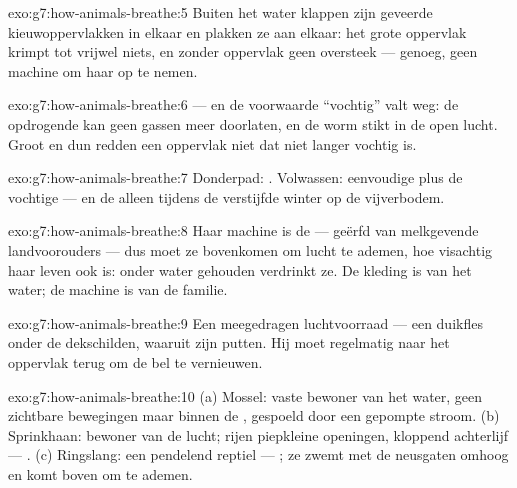 \begin{solution}{exo:g7:how-animals-breathe:5}
Buiten het water klappen zijn geveerde kieuwoppervlakken in elkaar en
plakken ze aan elkaar: het grote oppervlak krimpt tot vrijwel niets, en
zonder oppervlak geen oversteek ---  genoeg, geen machine om haar
op te nemen.
\end{solution}

\begin{solution}{exo:g7:how-animals-breathe:6}
 --- en de voorwaarde ``vochtig'' valt weg: de opdrogende
 kan geen gassen meer doorlaten, en de worm stikt in de open lucht.
Groot en dun redden een oppervlak niet dat niet langer vochtig is.
\end{solution}

\begin{solution}{exo:g7:how-animals-breathe:7}
Donderpad: . Volwassen: eenvoudige  plus de vochtige 
--- en de  alleen tijdens de verstijfde winter op de vijverbodem.
\end{solution}

\begin{solution}{exo:g7:how-animals-breathe:8}
Haar machine is de  --- geërfd van melkgevende landvoorouders ---
dus moet ze bovenkomen om lucht te ademen, hoe visachtig haar leven ook
is: onder water gehouden verdrinkt ze. De kleding is van het water; de
machine is van de familie.
\end{solution}

\begin{solution}{exo:g7:how-animals-breathe:9}
Een meegedragen luchtvoorraad --- een duikfles onder de dekschilden,
waaruit zijn  putten. Hij moet regelmatig naar het oppervlak
terug om de bel te vernieuwen.
\end{solution}

\begin{solution}{exo:g7:how-animals-breathe:10}
(a) Mossel: vaste bewoner van het water, geen zichtbare bewegingen maar
 binnen de , gespoeld door een gepompte stroom. (b)
Sprinkhaan: bewoner van de lucht; rijen piepkleine openingen, kloppend
achterlijf --- . (c) Ringslang: een pendelend reptiel --- ;
ze zwemt met de neusgaten omhoog en komt boven om te ademen.
\end{solution}

